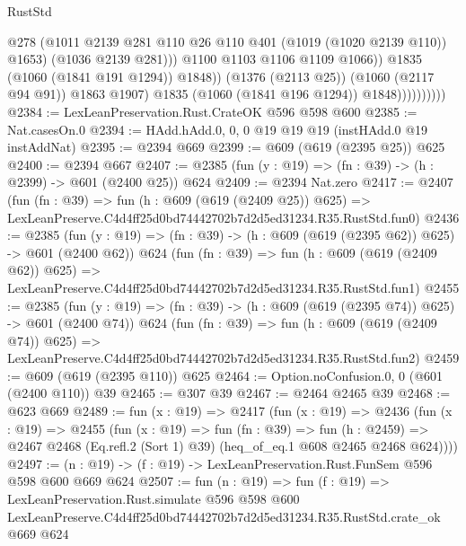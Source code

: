 \begin{lexlean}{RustStd}
\begin{coremodule}
                                      @278
                                      (@1011
                                        @2139
                                        @281
                                        @110
                                        @26
                                        @110
                                        @401
                                        (@1019 (@1020 @2139 @110))
                                        @1653)
                                      (@1036 @2139 @281)))
                                  @1100
                                  @1103
                                  @1106
                                  @1109
                                  @1066))
                              @1835
                              (@1060 (@1841 @191 @1294))
                              @1848))
                          (@1376 (@2113 @25))
                          (@1060 (@2117 @94 @91))
                          @1863
                          @1907)
                        @1835
                        (@1060 (@1841 @196 @1294))
                        @1848))))))))))
@2384 := LexLeanPreservation.Rust.CrateOK @596 @598 @600
@2385 := Nat.casesOn.{0}
@2394 := HAdd.hAdd.{0, 0, 0} @19 @19 @19 (instHAdd.{0} @19 instAddNat)
@2395 := @2394 @669
@2399 := @609 (@619 (@2395 @25)) @625
@2400 := @2394 @667
@2407 := @2385 (fun (y : @19) => (fn : @39) -> (h : @2399) -> @601 (@2400 @25)) @624
@2409 := @2394 Nat.zero
@2417 := @2407
    (fun (fn : @39) =>
    fun (h : @609 (@619 (@2409 @25)) @625) =>
    LexLeanPreserve.C4d4ff25d0bd74442702b7d2d5ed31234.R35.RustStd.fun0)
@2436 := @2385
    (fun (y : @19) => (fn : @39) -> (h : @609 (@619 (@2395 @62)) @625) -> @601 (@2400 @62))
    @624
    (fun (fn : @39) =>
    fun (h : @609 (@619 (@2409 @62)) @625) =>
    LexLeanPreserve.C4d4ff25d0bd74442702b7d2d5ed31234.R35.RustStd.fun1)
@2455 := @2385
    (fun (y : @19) => (fn : @39) -> (h : @609 (@619 (@2395 @74)) @625) -> @601 (@2400 @74))
    @624
    (fun (fn : @39) =>
    fun (h : @609 (@619 (@2409 @74)) @625) =>
    LexLeanPreserve.C4d4ff25d0bd74442702b7d2d5ed31234.R35.RustStd.fun2)
@2459 := @609 (@619 (@2395 @110)) @625
@2464 := Option.noConfusion.{0, 0} (@601 (@2400 @110)) @39
@2465 := @307 @39
@2467 := @2464 @2465 @39
@2468 := @623 @669
@2489 := fun (x : @19) =>
  @2417
    (fun (x : @19) =>
    @2436
      (fun (x : @19) =>
      @2455
        (fun (x : @19) =>
        fun (fn : @39) =>
        fun (h : @2459) =>
        @2467 @2468 (Eq.refl.{2} (Sort 1) @39) (heq_of_eq.{1} @608 @2465 @2468 @624))))
@2497 := (n : @19) -> (f : @19) -> LexLeanPreservation.Rust.FunSem @596 @598 @600 @669 @624
@2507 := fun (n : @19) =>
  fun (f : @19) =>
  LexLeanPreservation.Rust.simulate
    @596
    @598
    @600
    LexLeanPreserve.C4d4ff25d0bd74442702b7d2d5ed31234.R35.RustStd.crate_ok
    @669
    @624
\end{coremodule}
\end{lexlean}
